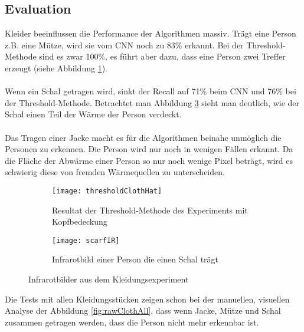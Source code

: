 \subsection{Evaluation}
Kleider beeinflussen die Performance der Algorithmen massiv. Trägt eine Person z.B. eine Mütze, wird sie vom \gls{CNN} noch zu 83\% erkannt. Bei der Threshold-Methode sind es zwar 100\%, es führt aber dazu, dass eine Person zwei Treffer erzeugt (siehe Abbildung \ref{fig:thresholdClothHat}).\\
\\
Wenn ein Schal getragen wird, sinkt der Recall auf 71\% beim \gls{CNN} und 76\% bei der Threshold-Methode. Betrachtet man Abbildung \ref{fig:scarfIR} sieht man deutlich, wie der Schal einen Teil der Wärme der Person verdeckt.\\
\\
Das Tragen einer Jacke macht es für die Algorithmen beinahe unmöglich die Personen zu erkennen. Die Person wird nur noch in wenigen Fällen erkannt. Da die Fläche der Abwärme einer Person so nur noch wenige Pixel beträgt, wird es schwierig diese von fremden Wärmequellen zu unterscheiden.\\

\begin{figure}[H]
	\centering
	\begin{subfigure}{.45\linewidth}
		\centering
		\texttt{[image: thresholdClothHat]}
		\caption{Resultat der Threshold-Methode des Experiments mit Kopfbedeckung}
		\label{fig:thresholdClothHat}
	\end{subfigure}\hfill%
	\begin{subfigure}{.45\linewidth}
		\centering
		\texttt{[image: scarfIR]}
		\caption{Infrarotbild einer Person die einen Schal trägt}
		\label{fig:scarfIR}
	\end{subfigure}\hfill%
	\caption{Infrarotbilder aus dem Kleidungsexperiment}
\end{figure}

\noindent
Die Tests mit allen Kleidungsstücken zeigen schon bei der manuellen, visuellen Analyse der Abbildung \ref{fig:rawClothAll}, dass wenn Jacke, Mütze und Schal zusammen getragen werden, dass die Person nicht mehr erkennbar ist.

